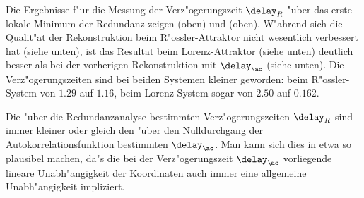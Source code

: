 Die Ergebnisse f"ur die Messung der Verz"ogerungszeit $\delay_R$ "uber das erste lokale
Minimum der Redundanz zeigen  (oben) und 
(oben). W"ahrend sich die Qualit"at der Rekonstruktion beim
R"ossler-Attraktor nicht wesentlich verbessert hat (siehe  unten), ist
das Resultat beim Lorenz-Attraktor (siehe  unten)
deutlich besser als bei der vorherigen Rekonstruktion mit $\delay_\ac$ (siehe  unten). Die Verz"ogerungszeiten sind
bei beiden Systemen kleiner geworden: beim R"ossler-System von $1.29$ auf $1.16$, beim
Lorenz-System sogar von $2.50$ auf $0.162$.  

Die "uber die
Redundanzanalyse bestimmten Verz"ogerungszeiten $\delay_R$ sind immer kleiner oder gleich den
"uber den Nulldurchgang der Autokorrelationsfunktion bestimmten $\delay_\ac$. Man kann
sich dies in etwa so plausibel machen, da"s die bei der Verz"ogerungszeit $\delay_\ac$
vorliegende lineare Unabh"angigkeit der Koordinaten auch immer eine allgemeine
Unabh"angigkeit impliziert.


\clearpage










